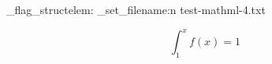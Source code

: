 \documentclass{article}
\begin{document}
\ExplSyntaxOn
\luamml_flag_structelem:  
\luamml_set_filename:n {test-mathml-4.txt} 
\ExplSyntaxOff

\[ \int_1^x f(x) = 1 \]
\end{document}
